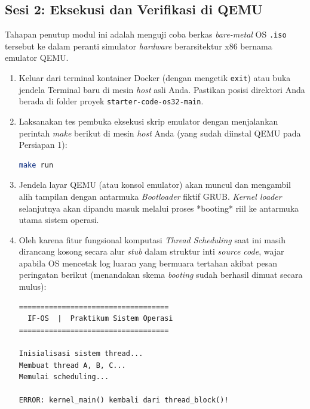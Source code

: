 \subsection{Sesi 2: Eksekusi dan Verifikasi di QEMU}
\label{sec:m07-sesi-2}
Tahapan penutup modul ini adalah menguji coba berkas \textit{bare-metal} OS \texttt{.iso} tersebut ke dalam peranti simulator \textit{hardware} berarsitektur x86 bernama emulator QEMU.
\begin{enumerate}
	\item Keluar dari terminal kontainer Docker (dengan mengetik \texttt{exit}) atau buka jendela Terminal baru di mesin \textit{host} asli Anda. Pastikan posisi direktori Anda berada di folder proyek \texttt{starter-code-os32-main}.
	\item Laksanakan tes pembuka eksekusi skrip emulator dengan menjalankan perintah \textit{make} berikut di mesin \textit{host} Anda (yang sudah diinstal QEMU pada Persiapan 1):
	      \begin{lstlisting}[language=bash, caption={Perintah memacu virtualisasi QEMU meluncurkan file OS biner}]
make run
    \end{lstlisting}

	\item Jendela layar QEMU (atau konsol emulator) akan muncul dan mengambil alih tampilan dengan antarmuka \textit{Bootloader} fiktif GRUB. \textit{Kernel loader} selanjutnya akan dipandu masuk melalui proses *booting* riil ke antarmuka utama sistem operasi.

	\item Oleh karena fitur fungsional komputasi \textit{Thread Scheduling} saat ini masih dirancang kosong secara alur \textit{stub} dalam struktur inti \textit{source code}, wajar apabila OS mencetak log luaran yang bermuara tertahan akibat pesan peringatan berikut (menandakan skema \textit{booting} sudah berhasil dimuat secara mulus):
	      \begin{lstlisting}[caption={Pesan luaran *Thread block* sebagai bukti akhir keberhasilan simulasi di QEMU}]
===================================
  IF-OS  |  Praktikum Sistem Operasi
===================================

Inisialisasi sistem thread...
Membuat thread A, B, C...
Memulai scheduling...

ERROR: kernel_main() kembali dari thread_block()!
    \end{lstlisting}
\end{enumerate}
